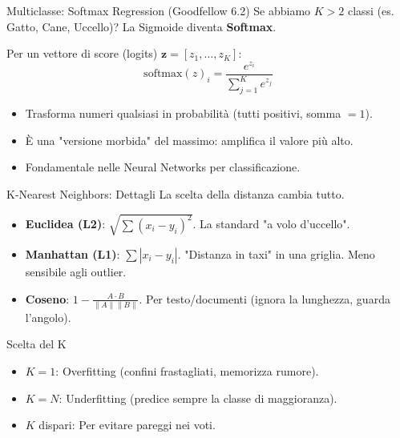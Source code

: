 \documentclass[aspectratio=169, 10pt]{beamer}
\begin{document}
\begin{frame}{Multiclasse: Softmax Regression (Goodfellow 6.2)}
    Se abbiamo $K > 2$ classi (es. Gatto, Cane, Uccello)?
    La Sigmoide diventa \textbf{Softmax}.
    
    Per un vettore di score (logits) $\mathbf{z} = [z_1, \dots, z_K]$:
    \[ \text{softmax}(z)_i = \frac{e^{z_i}}{\sum_{j=1}^K e^{z_j}} \]
    
    \begin{itemize}
        \item Trasforma numeri qualsiasi in probabilità (tutti positivi, somma $= 1$).
        \item È una "versione morbida" del massimo: amplifica il valore più alto.
        \item Fondamentale nelle Neural Networks per classificazione.
    \end{itemize}
\end{frame}

\begin{frame}{K-Nearest Neighbors: Dettagli}
    La scelta della distanza cambia tutto.
    
    \begin{itemize}
        \item \textbf{Euclidea (L2)}: $\sqrt{\sum (x_i - y_i)^2}$. La standard "a volo d'uccello".
        \item \textbf{Manhattan (L1)}: $\sum |x_i - y_i|$. "Distanza in taxi" in una griglia. Meno sensibile agli outlier.
        \item \textbf{Coseno}: $1 - \frac{A \cdot B}{\|A\|\|B\|}$. Per testo/documenti (ignora la lunghezza, guarda l'angolo).
    \end{itemize}
    
    \begin{alertblock}{Scelta del K}
        \begin{itemize}
            \item $K=1$: Overfitting (confini frastagliati, memorizza rumore).
            \item $K=N$: Underfitting (predice sempre la classe di maggioranza).
            \item $K$ dispari: Per evitare pareggi nei voti.
        \end{itemize}
    \end{alertblock}
\end{frame}
\end{document}
